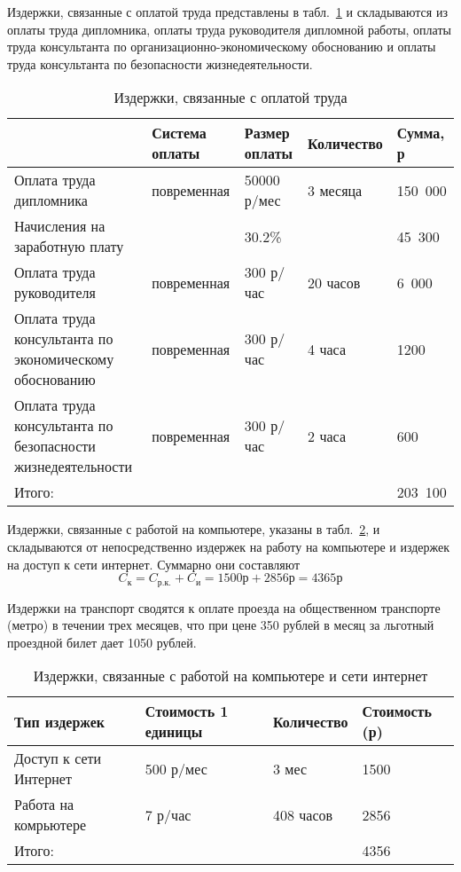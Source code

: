 Издержки, связанные с оплатой труда представлены в табл.~\ref{costs-salary}
и складываются из оплаты труда дипломника, оплаты труда руководителя дипломной работы, оплаты труда консультанта по организационно-экономическому обоснованию и оплаты труда консультанта по безопасности жизнедеятельности.

\begin{table}
\center
\caption{Издержки, связанные с оплатой труда}
\label{costs-salary}
\begin{tabular}{|p{4cm}|p{3cm}|p{2cm}|p{2.5cm}|p{2cm}|}
\hline 
 & Система оплаты & Размер оплаты & Количество & Сумма, р \\ 
\hline 
Оплата труда дипломника & повременная & 50000 р/мес & 3 месяца & 150~000 \\ 
\hline
Начисления на заработную плату &  & 30.2\% & & 45~300\\ 
\hline 
Оплата труда руководителя & повременная & 300 р/час & 20 часов & 6~000 \\ 
\hline 
Оплата труда консультанта по экономическому обоснованию & повременная & 300 р/час & 4 часа & 1200 \\ 
\hline 
Оплата труда консультанта по безопасности жизнедеятельности & повременная & 300 р/час & 2 часа & 600 \\ 
\hline 
Итого:  &  &  &  & 203~100 \\ 
\hline 
\end{tabular}
\end{table}

Издержки, связанные с работой на компьютере, указаны в табл.~\ref{costs-computer},
и складываются от непосредственно издержек на работу на компьютере и издержек на 
доступ к сети интернет. Суммарно они составляют
$$ C_{к}= C_{р.к.} + C_{и} = 1500 р + 2856 р = 4365 р $$

Издержки на транспорт сводятся к оплате проезда на общественном транспорте (метро) в течении трех месяцев, что при цене 350 рублей в месяц за льготный проездной билет дает 1050 рублей.

\begin{table}
\center
\caption{Издержки, связанные с работой на компьютере и сети интернет}
\label{costs-computer}
\begin{tabular}{|p{3cm}|p{3cm}|p{3cm}|p{3cm}|}
\hline 
Тип издержек & Стоимость 1 единицы & Количество & Стоимость (р) \\ 
\hline 
Доступ к сети Интернет & 500 р/мес & 3 мес & 1500 \\ 
\hline
Работа на комрьютере & 7 р/час & 408 часов & 2856\\ 
\hline 
Итого:  &  &  & 4356 \\ 
\hline
\end{tabular}
\end{table}

